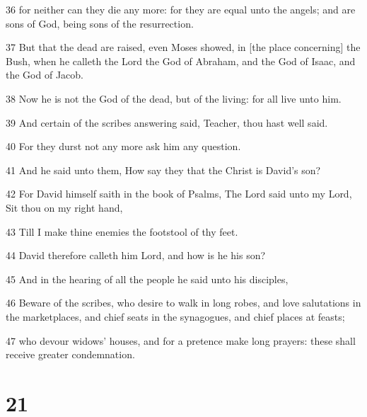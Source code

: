 \par 36 for neither can they die any more: for they are equal unto the angels; and are sons of God, being sons of the resurrection.
\par 37 But that the dead are raised, even Moses showed, in [the place concerning] the Bush, when he calleth the Lord the God of Abraham, and the God of Isaac, and the God of Jacob.
\par 38 Now he is not the God of the dead, but of the living: for all live unto him.
\par 39 And certain of the scribes answering said, Teacher, thou hast well said.
\par 40 For they durst not any more ask him any question.
\par 41 And he said unto them, How say they that the Christ is David's son?
\par 42 For David himself saith in the book of Psalms, The Lord said unto my Lord, Sit thou on my right hand,
\par 43 Till I make thine enemies the footstool of thy feet.
\par 44 David therefore calleth him Lord, and how is he his son?
\par 45 And in the hearing of all the people he said unto his disciples,
\par 46 Beware of the scribes, who desire to walk in long robes, and love salutations in the marketplaces, and chief seats in the synagogues, and chief places at feasts;
\par 47 who devour widows' houses, and for a pretence make long prayers: these shall receive greater condemnation.

\chapter{21}

